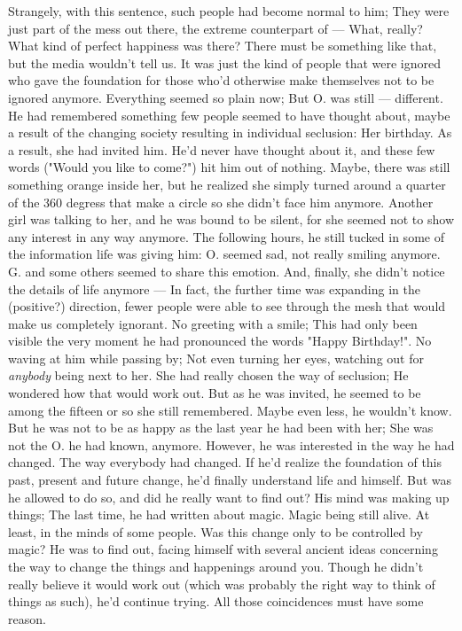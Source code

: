 Strangely, with this sentence, such people had become normal to him; They were just part of the mess out there, the extreme counterpart of --- What, really? What kind of perfect happiness was there? There must be something like that, but the media wouldn't tell us. It was just the kind of people that were ignored who gave the foundation for those who'd otherwise make themselves not to be ignored anymore. 
Everything seemed so plain now; But O. was still --- different. He had remembered something few people seemed to have thought about, maybe a result of the changing society resulting in individual seclusion: Her birthday. 
As a result, she had invited him. He'd never have thought about it, and these few words ("Would you like to come?") hit him out of nothing. Maybe, there was still something orange inside her, but he realized she simply turned around a quarter of the 360 degress that make a circle so she didn't face him anymore. Another girl was talking to her, and he was bound to be silent, for she seemed not to show any interest in any way anymore. 
The following hours, he still tucked in some of the information life was giving him: O. seemed sad, not really smiling anymore. G. and some others seemed to share this emotion. And, finally, she didn't notice the details of life anymore --- In fact, the further time was expanding in the (positive?) direction, fewer people were able to see through the mesh that would make us completely ignorant. 
No greeting with a smile; This had only been visible the very moment he had pronounced the words "Happy Birthday!". 
No waving at him while passing by; Not even turning her eyes, watching out for \emph{anybody} being next to her. 
She had really chosen the way of seclusion; He wondered how that would work out. But as he was invited, he seemed to be among the fifteen or so she still remembered. Maybe even less, he wouldn't know. 
But he was not to be as happy as the last year he had been with her; She was not the O. he had known, anymore. However, he was interested in the way he had changed. 
The way everybody had changed. 
If he'd realize the foundation of this past, present and future change, he'd finally understand life and himself. But was he allowed to do so, and did he really want to find out? 
His mind was making up things; The last time, he had written about magic. Magic being still alive. At least, in the minds of some people. Was this change only to be controlled by magic? He was to find out, facing himself with several ancient ideas concerning the way to change the things and happenings around you. Though he didn't really believe it would work out (which was probably the right way to think of things as such), he'd continue trying. All those coincidences must have some reason. 
